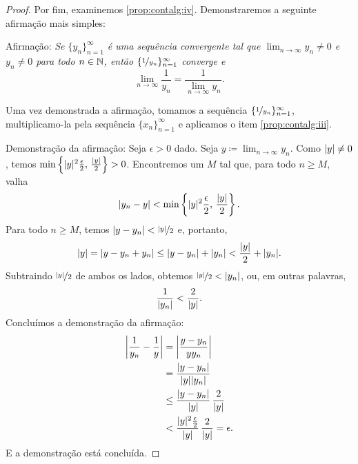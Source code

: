 \begin{proof}
Por fim, examinemos
\ref{prop:contalg:iv}.
Demonstraremos a seguinte afirmação mais simples:

Afirmação: \emph{Se $\{ y_n \}_{n=1}^\infty$ é uma sequência convergente tal que
$\lim_{n\to\infty} y_n \neq 0$ e $y_n \neq 0$ para todo $n \in {\mathbb{N}}$, então
$\{ \nicefrac{1}{y_n} \}_{n=1}^\infty$ converge e}
\begin{equation*}
\lim_{n\to\infty} \frac{1}{y_n} = \frac{1}{\lim_{n\to\infty} y_n} .
\end{equation*}

Uma vez demonstrada a afirmação, tomamos a sequência
$\{ \nicefrac{1}{y_n} \}_{n=1}^\infty$,
multiplicamo-la pela sequência $\{ x_n \}_{n=1}^\infty$ e aplicamos o item
\ref{prop:contalg:iii}.

Demonstração da afirmação: Seja $\epsilon > 0$ dado.
Seja $y \coloneqq \lim_{n\to\infty} y_n$.
Como $\lvert {y} \rvert \neq 0$, temos
$\min \left\{ \lvert {y} \rvert^2\frac{\epsilon}{2}, \, \frac{\lvert {y} \rvert}{2} \right\} > 0$.
Encontremos um $M$ tal que, para todo $n \geq M$,
valha
\begin{equation*}
\lvert {y_n - y} \rvert < \min \left\{ \lvert {y} \rvert^2\frac{\epsilon}{2}, \, \frac{\lvert {y} \rvert}{2}
\right\} .
\end{equation*}
Para todo $n \geq M$, temos
$\lvert {y - y_n} \rvert < \nicefrac{\lvert {y} \rvert}{2}$ e, portanto,
\begin{equation*}
\lvert {y} \rvert =
\lvert {y - y_n + y_n } \rvert \leq
\lvert {y - y_n} \rvert + \lvert { y_n } \rvert < \frac{\lvert {y} \rvert}{2} + \lvert {y_n} \rvert.
\end{equation*}
Subtraindo $\nicefrac{\lvert {y} \rvert}{2}$ de ambos os lados, obtemos
$\nicefrac{\lvert {y} \rvert}{2} < \lvert {y_n} \rvert$, ou, em outras palavras,
\begin{equation*}
\frac{1}{\lvert {y_n} \rvert} < \frac{2}{\lvert {y} \rvert} .
\end{equation*}
Concluímos a demonstração da afirmação:
\begin{equation*}
\begin{split}
\abs{\frac{1}{y_n} - \frac{1}{y}} &=
\abs{\frac{y - y_n}{y y_n}} \\
& =
\frac{\sabs{y - y_n}}{\sabs{y} \sabs{y_n}} \\
& \leq
\frac{\sabs{y - y_n}}{\sabs{y}} \, \frac{2}{\sabs{y}} \\
& <
\frac{\sabs{y}^2 \frac{\epsilon}{2}}{\sabs{y}} \, \frac{2}{\sabs{y}}
= \epsilon .
\end{split}
\avoidbreak
\end{equation*}
E a demonstração está concluída.
\end{proof}

